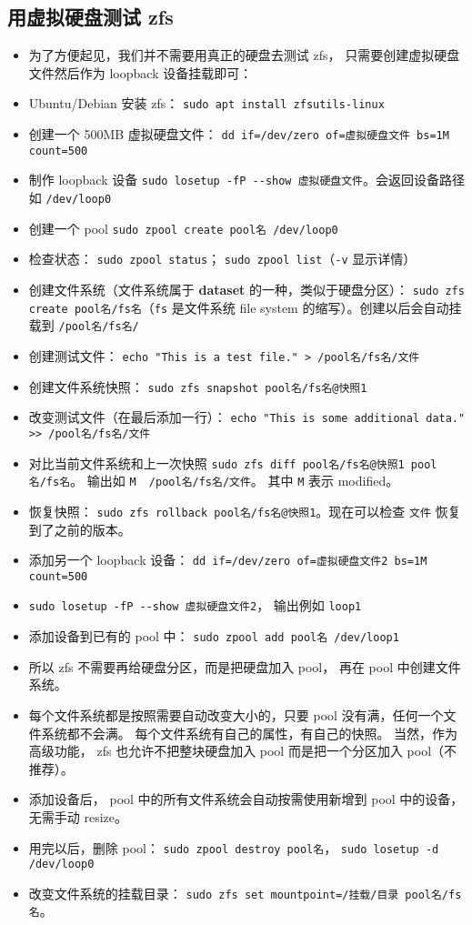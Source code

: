 \subsection{用虚拟硬盘测试 zfs}\label{sub_ZFS_1}
\begin{itemize}
\item 为了方便起见，我们并不需要用真正的硬盘去测试 zfs， 只需要创建虚拟硬盘文件然后作为 loopback 设备挂载即可：
\item Ubuntu/Debian 安装 zfs： \verb|sudo apt install zfsutils-linux|
\item 创建一个 500MB 虚拟硬盘文件： \verb|dd if=/dev/zero of=虚拟硬盘文件 bs=1M count=500|
\item 制作 loopback 设备 \verb|sudo losetup -fP --show 虚拟硬盘文件|。会返回设备路径如 \verb|/dev/loop0|
\item 创建一个 pool \verb|sudo zpool create pool名 /dev/loop0|
\item 检查状态： \verb|sudo zpool status|； \verb|sudo zpool list|（\verb|-v| 显示详情）
\item 创建文件系统（文件系统属于 \textbf{dataset} 的一种，类似于硬盘分区）： \verb|sudo zfs create pool名/fs名|（\verb|fs| 是文件系统 file system 的缩写）。创建以后会自动挂载到 \verb`/pool名/fs名/`
\item 创建测试文件： \verb|echo "This is a test file." > /pool名/fs名/文件|
\item 创建文件系统快照： \verb|sudo zfs snapshot pool名/fs名@快照1|
\item 改变测试文件（在最后添加一行）： \verb|echo "This is some additional data." >> /pool名/fs名/文件|
\item 对比当前文件系统和上一次快照 \verb|sudo zfs diff pool名/fs名@快照1 pool名/fs名|。 输出如 \verb|M	/pool名/fs名/文件|。 其中 \verb|M| 表示 modified。
\item 恢复快照： \verb|sudo zfs rollback pool名/fs名@快照1|。现在可以检查 \verb|文件| 恢复到了之前的版本。
\item 添加另一个 loopback 设备： \verb|dd if=/dev/zero of=虚拟硬盘文件2 bs=1M count=500|
\item \verb|sudo losetup -fP --show 虚拟硬盘文件2|， 输出例如 \verb|loop1|
\item 添加设备到已有的 pool 中： \verb|sudo zpool add pool名 /dev/loop1|
\item 所以 zfs 不需要再给硬盘分区，而是把硬盘加入 pool， 再在 pool 中创建文件系统。
\item 每个文件系统都是按照需要自动改变大小的，只要 pool 没有满，任何一个文件系统都不会满。
每个文件系统有自己的属性，有自己的快照。 当然，作为高级功能， zfs 也允许不把整块硬盘加入 pool 而是把一个分区加入 pool（不推荐）。
\item 添加设备后， pool 中的所有文件系统会自动按需使用新增到 pool 中的设备，无需手动 resize。
\item 用完以后，删除 pool： \verb|sudo zpool destroy pool名|， \verb|sudo losetup -d /dev/loop0|
\item 改变文件系统的挂载目录： \verb|sudo zfs set mountpoint=/挂载/目录 pool名/fs名|。
\end{itemize}

